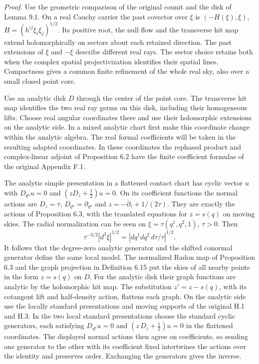 \documentclass[
  english,
  11pt,
  reqno]{amsart}
\begin{document}
\emph{Proof.} Use the geometric comparison of the original counit and
the disk of Lemma 9.1. On a real Cauchy carrier the past covector over
\(\xi\) is \((-H(\xi),\xi)\), \(H=(h^{ij}\xi_i\xi_j)^{1/2}\). Its
positive root, the null flow and the transverse hit map extend
holomorphically on sectors about each retained direction. The past
extensions of \(\xi\) and \(-\xi\) describe different real rays. The
sector choice retains both when the complex spatial projectivization
identifies their spatial lines. Compactness gives a common finite
refinement of the whole real sky, also over a small closed point core.

Use an analytic disk \(D\) through the center of the point core. The
transverse hit map identifies the two real ray germs on this disk,
including their homogeneous lifts. Choose real angular coordinates there
and use their holomorphic extensions on the analytic side. In a mixed
analytic chart first make this coordinate change within the analytic
algebra. The real formal coefficients will be taken in the resulting
adapted coordinates. In these coordinates the rephased product and
complex-linear adjoint of Proposition 6.2 have the finite coefficient
formulas of the original Appendix F.1.

The analytic simple presentation in a flattened contact chart has cyclic
vector \(u\) with \(D_{q^a}u=0\) and \((zD_z+\tfrac12)u=0\). On its
coefficient functions the normal actions are \(D_z=\tau\),
\(D_{q^a}=\partial_{q^a}\) and \(z=-\partial_\tau+1/(2\tau)\). They are
exactly the actions of Proposition 6.3, with the translated equations
for \(z=s(q)\) on moving skies. The radial normalization can be seen on
\(\xi=\tau(q^1,q^2,1)\), \(\tau>0\). Then%
 \[
\tau^{-3/2}|d^3\xi|^{1/2}
   =|dq^1dq^2\,d\tau/\tau|^{1/2}.
\] It follows that the degree-zero analytic generator and the shifted
conormal generator define the same local model. The normalized Radon map
of Proposition 6.3 and the graph projection in Definition 6.15 put the
skies of all nearby points in the form \(z=s(q)\) on \(D\). For the
analytic disk their graph functions are analytic by the holomorphic hit
map. The substitution \(z'=z-s(q)\), with its cotangent lift and
half-density action, flattens each graph. On the analytic side use the
locally standard presentations and moving supports of the original H.1
and H.3. In the two local standard presentations choose the standard
cyclic generators, each satisfying \(D_{q^a}u=0\) and
\((z\,D_z+\tfrac12)u=0\) in the flattened coordinates. The displayed
normal actions then agree on coefficients, so sending one generator to
the other with its coefficient fixed intertwines the actions over the
identity and preserves order. Exchanging the generators gives the
inverse.
\end{document}
